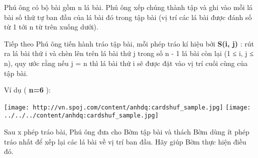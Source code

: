 Phú ông có bộ bài gồm n lá bài. Phú ông xếp chúng thành tập và ghi vào mỗi lá bài số thứ tự ban đầu của lá bài đó trong tập bài (vị trí các lá bài được đánh số từ 1 tới n từ trên xuống dưới).


Tiếp theo Phú ông tiến hành tráo tập bài, mỗi phép tráo kí hiệu bởi \textbf{ S(i, j) } : rút ra lá bài thứ i và chèn lên trên lá bài thứ j trong số n - 1 lá bài còn lại (1 ≤ i, j ≤ n), quy ước rằng nếu j = n thì lá bài thứ i sẽ được đặt vào vị trí cuối cùng của tập bài.


Ví dụ ( \textbf{ n=6 } ):


\texttt{[image: http://vn.spoj.com/content/anhdq:cardshuf\_sample.jpg]}
\texttt{[image: ../../../content/anhdq:cardshuf\_sample.jpg]}




Sau x phép tráo bài, Phú ông đưa cho Bờm tập bài và thách Bờm dùng ít phép tráo nhất để xếp lại các lá bài về vị trí ban đầu. Hãy giúp Bờm thực hiện điều đó.